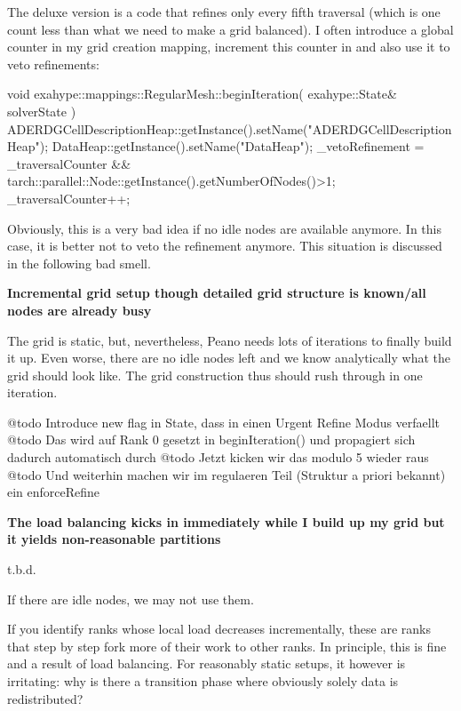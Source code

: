The deluxe version is a code that refines only every fifth traversal (which is
one count less than what we need to make a grid balanced). 
I often introduce a global counter in my grid creation mapping, increment this
counter in  and also use it to veto refinements:
\begin{code}
void exahype::mappings::RegularMesh::beginIteration(
  exahype::State& solverState
) {
  ADERDGCellDescriptionHeap::getInstance().setName("ADERDGCellDescriptionHeap");
  DataHeap::getInstance().setName("DataHeap");
  _vetoRefinement = _traversalCounter%
                 && tarch::parallel::Node::getInstance().getNumberOfNodes()>1;
  _traversalCounter++;
}
\end{code} 
\noindent
Obviously, this is a very bad idea if no idle nodes are available anymore. 
In this case, it is better not to veto the refinement anymore.
This situation is discussed in the following bad smell. 



\vspace{0.6cm}
{\bf \large Incremental grid setup though detailed grid structure is
known/all nodes are already busy}


\begin{smell}
The grid is static, but, nevertheless, Peano needs lots of iterations to finally
build it up. Even worse, there are no idle nodes left and we know analytically
what the grid should look like.
The grid construction thus should rush through in one iteration.
\end{smell}


@todo Introduce new flag in State, dass in einen Urgent Refine Modus verfaellt
@todo Das wird auf Rank 0 gesetzt in beginIteration() und propagiert sich
dadurch automatisch durch
@todo Jetzt kicken wir das modulo 5 wieder raus
@todo Und weiterhin machen wir im regulaeren Teil (Struktur a priori bekannt)
ein enforceRefine



{\bf The load balancing kicks in immediately while I build up my grid but it
yields non-reasonable partitions}


\begin{smell}
t.b.d.
\end{smell}


If there are idle nodes, we may not use them.

If you identify ranks whose local load decreases incrementally, these are ranks
that step by step fork more of their work to other ranks. 
In principle, this is fine and a result of load balancing. 
For reasonably static setups, it however is irritating: 
why is there a transition phase where obviously solely data is
redistributed?





